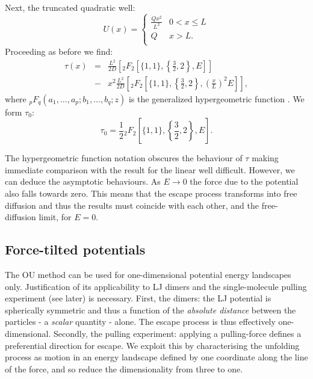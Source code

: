 \documentclass[twocolumn,pre,aps,showpacs,a4paper,floatfix,amssymb]{revtex4-1}
\newcommand{\HGPFQ}{{}_pF_q}
\newcommand{\MAi}[1]{#1} %
\begin{document}
Next, the truncated quadratic well:
\begin{equation}
U(x) = 
\begin{cases} 
\frac{Qx^2}{L^2} & 0 < x \leq L\\
Q & x > L. \\
\end{cases}
\label{eq:quadraticpot}
\end{equation}
Proceeding as before we find:
\begin{eqnarray}
\tau\MAi{(x)} &=& \frac{L^2}{2D}\left[{}_2 F_2\left[\{1,1\},\left\{\frac{3}{2},2\right\},E\right]\right] \\
&-& x^2\frac{L^2}{2D}\left[{}_2 F_2\left[\{1,1\},\left\{\frac{3}{2},2\right\},\left(\frac{x}{L}\right)^2 E \right]\right], \nonumber
\label{eq:quadratic}
\end{eqnarray}
where $\HGPFQ(a_{1},...,a_{p};b_{1},...,b_{q};z)$ is the generalized hypergeometric function \cite{HGPFQ}. 
We form $\tau_0$:
\begin{equation}
\tau_0 = \frac{1}{2}{}_2 F_2\left[\{1,1\}, \left\{\frac{3}{2},2\right\}, E\right].
\label{eq:quadratic1}
\end{equation}


The hypergeometric function notation obscures the behaviour of $\tau$ making immediate comparison with the result for the linear well difficult. However, we can deduce the asymptotic behaviours. As $E \rightarrow 0$ the force due to the potential also falls towards zero. This means that the escape process transforms into free diffusion and thus the results must coincide with each other, and the free-diffusion limit, for $E=0$.


\subsection{Force-tilted potentials}
The OU method can be used for one-dimensional potential energy landscapes only. Justification of its applicability to LJ dimers and the single-molecule pulling experiment (see later) is necessary. First, the dimers: the LJ potential is spherically symmetric and thus a function of the \textit{absolute distance} between the particles - a \textit{scalar} quantity - alone. The escape process is thus effectively one-dimensional. Secondly, the pulling experiment: applying a pulling-force defines a preferential direction for escape. We exploit this by characterising the unfolding process as motion in an energy landscape defined by one coordinate along the line of the force, and so reduce the dimensionality from three to one.
\end{document}
